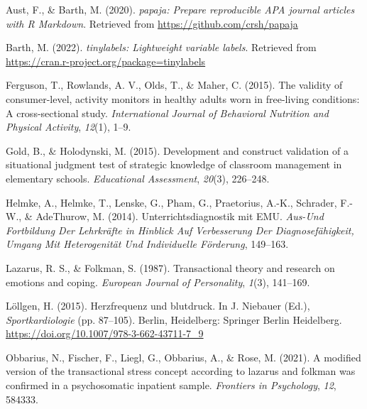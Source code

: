 \documentclass[
  man]{apa6}
\newlength{\cslhangindent}
\newlength{\cslentryspacingunit} %
\newenvironment{CSLReferences}[2] %
 {%
  \setlength{\parindent}{0pt}
  \ifodd #1
  \let\oldpar\par
  \def\par{\hangindent=\cslhangindent\oldpar}
  \fi
  \setlength{\parskip}{#2\cslentryspacingunit}
 }%
 {}
\begin{document}
\hypertarget{refs}{}
\begin{CSLReferences}{1}{0}
\leavevmode{}%
Aust, F., \& Barth, M. (2020). \emph{{papaja}: {Prepare} reproducible {APA} journal articles with {R Markdown}}. Retrieved from \url{https://github.com/crsh/papaja}

\leavevmode{}%
Barth, M. (2022). \emph{{tinylabels}: Lightweight variable labels}. Retrieved from \url{https://cran.r-project.org/package=tinylabels}

\leavevmode{}%
Ferguson, T., Rowlands, A. V., Olds, T., \& Maher, C. (2015). The validity of consumer-level, activity monitors in healthy adults worn in free-living conditions: A cross-sectional study. \emph{International Journal of Behavioral Nutrition and Physical Activity}, \emph{12}(1), 1--9.

\leavevmode{}%
Gold, B., \& Holodynski, M. (2015). Development and construct validation of a situational judgment test of strategic knowledge of classroom management in elementary schools. \emph{Educational Assessment}, \emph{20}(3), 226--248.

\leavevmode{}%
Helmke, A., Helmke, T., Lenske, G., Pham, G., Praetorius, A.-K., Schrader, F.-W., \& AdeThurow, M. (2014). Unterrichtsdiagnostik mit EMU. \emph{Aus-Und Fortbildung Der Lehrkr{ä}fte in Hinblick Auf Verbesserung Der Diagnosef{ä}higkeit, Umgang Mit Heterogenit{ä}t Und Individuelle F{ö}rderung}, 149--163.

\leavevmode{}%
Lazarus, R. S., \& Folkman, S. (1987). Transactional theory and research on emotions and coping. \emph{European Journal of Personality}, \emph{1}(3), 141--169.

\leavevmode{}%
Löllgen, H. (2015). Herzfrequenz und blutdruck. In J. Niebauer (Ed.), \emph{Sportkardiologie} (pp. 87--105). Berlin, Heidelberg: Springer Berlin Heidelberg. \url{https://doi.org/10.1007/978-3-662-43711-7_9}

\leavevmode{}%
Obbarius, N., Fischer, F., Liegl, G., Obbarius, A., \& Rose, M. (2021). A modified version of the transactional stress concept according to lazarus and folkman was confirmed in a psychosomatic inpatient sample. \emph{Frontiers in Psychology}, \emph{12}, 584333.


\end{CSLReferences}
\end{document}

